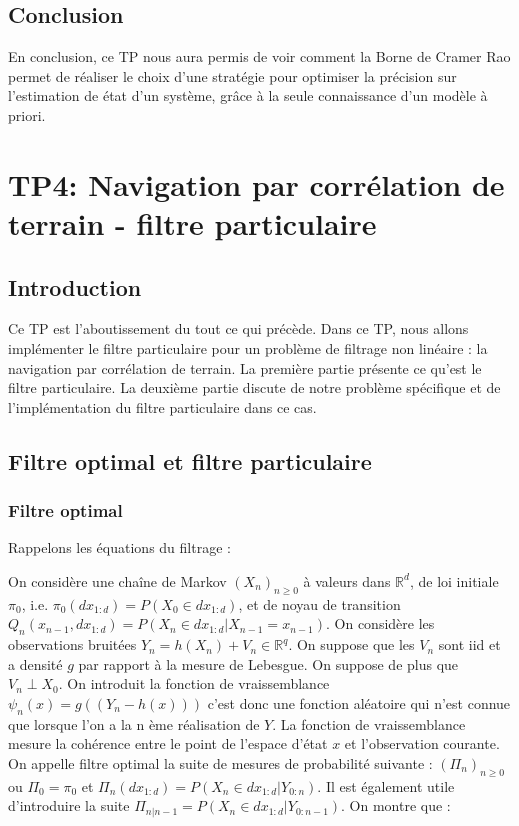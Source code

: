 \documentclass{article}
\begin{document}
\subsection{Conclusion}
En conclusion, ce TP nous aura permis de voir comment la Borne de Cramer Rao permet de réaliser le choix d'une stratégie pour 
optimiser la précision sur l'estimation de état d'un système, grâce à la seule connaissance d'un modèle à priori.

\clearpage


\section{TP4: Navigation par corrélation de terrain - filtre particulaire}
\subsection{Introduction}
Ce TP est l'aboutissement du tout ce qui précède. Dans ce TP, nous allons 
implémenter le filtre particulaire pour un problème de filtrage non linéaire : la navigation par corrélation de terrain. 
La première partie présente ce qu'est le filtre particulaire. La deuxième partie discute de 
notre problème spécifique et de l'implémentation du filtre particulaire dans ce cas. 
\subsection{Filtre optimal et filtre particulaire}
\subsubsection{Filtre optimal}
Rappelons les équations du filtrage :

On considère une chaîne de Markov $(X_{n})_{n \geq 0}$ à valeurs dans $\mathbb{R}^d$, de loi initiale $\pi_0$, i.e. $\pi_0(dx_{1:d})=P(X_0 \in dx_{1:d})$, et de noyau de transition 
$Q_{n}(x_{n-1},dx_{1:d})= P(X_n \in dx_{1:d} \vert X_{n-1}=x_{n-1} )$. 
On considère les observations bruitées $Y_n = h(X_n)+ V_n \in \mathbb{R}^q$. On suppose que les 
$V_n$ sont iid et a densité $g$ par rapport à la mesure de Lebesgue. On suppose de plus que $V_n \perp X_0$. On introduit la fonction de vraissemblance  
$\psi_n(x)=g((Y_n-h(x)))$ c'est donc une fonction aléatoire qui n'est connue que lorsque l'on a la n ème réalisation de $Y$. La fonction de vraissemblance mesure la cohérence entre le point de l'espace d'état $x$
et l'observation courante. \\
On appelle filtre optimal la suite de mesures de probabilité suivante : $(\Pi_n)_{n \geq 0}$ ou $\Pi_0 = \pi_0$ et $\Pi_n(dx_{1:d})= P(X_n \in dx_{1:d} \vert Y_{0:n})$. Il est également utile d'introduire la suite 
$\Pi_{n \vert n-1} = P(X_n \in dx_{1:d} \vert Y_{0:n-1})$. 
On montre que : 
\end{document}
